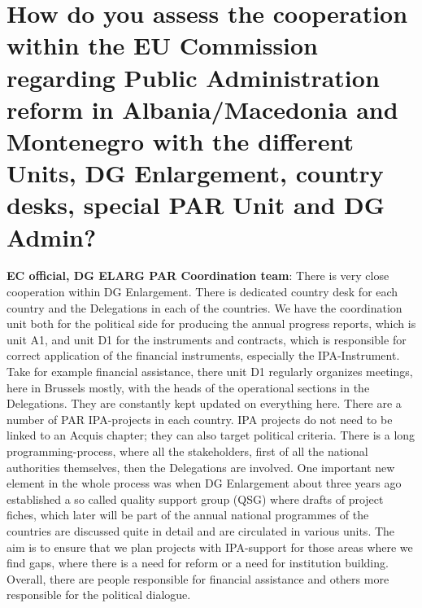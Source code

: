 \section{How do you assess the cooperation within the EU Commission regarding Public Administration reform in Albania/Macedonia and Montenegro with the different Units, DG Enlargement, country desks, special PAR Unit and DG Admin? }
\textbf{EC official, DG ELARG PAR Coordination team}: There is very close cooperation within DG Enlargement. There is dedicated country desk for each country and the Delegations in each of the countries. We have the coordination unit both for the political side for producing the annual progress reports, which is unit A1, and unit D1 for the instruments and contracts, which is responsible for correct application of the financial instruments, especially the IPA-Instrument. Take for example financial assistance, there unit D1 regularly organizes meetings, here in Brussels mostly, with the heads of the operational sections in the Delegations. They are constantly kept updated on everything here. There are a number of PAR IPA-projects in each country. IPA projects do not need to be linked to an Acquis chapter; they can also target political criteria. There is a long programming-process, where all the stakeholders, first of all the national authorities themselves, then the Delegations are involved. One important new element in the whole process was when DG Enlargement about three years ago established a so called quality support group (QSG) where drafts of project fiches, which later will be part of the annual national programmes of the countries are discussed quite in detail and are circulated in various units. The aim is to ensure that we plan projects with IPA-support for those areas where we find gaps, where there is a need for reform or a need for institution building. Overall, there are people responsible for financial assistance and others more responsible for the political dialogue. \\
